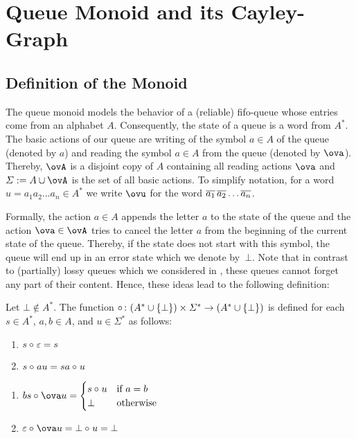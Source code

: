 \section{Queue Monoid and its Cayley-Graph}
\subsection{Definition of the Monoid}
The queue monoid models the behavior of a (reliable) fifo-queue whose entries come from an alphabet $A$. Consequently, the state of a queue is a word from $A^*$. The basic actions of our queue are writing of the symbol $a\in A$ of the queue (denoted by $a$) and reading the symbol $a\in A$ from the queue (denoted by $\ova$). Thereby, $\ovA$ is a disjoint copy of $A$ containing all reading actions $\ova$ and $\varSigma:=A\cup\ovA$ is the set of all basic actions. To simplify notation, for a word $u=a_1a_2\dots a_n\in A^*$ we write $\ovu$ for the word $\overline{a_1}\,\overline{a_2}\dots \overline{a_n}$.

Formally, the action $a\in A$ appends the letter $a$ to the state of the queue and the action $\ova\in\ovA$ tries to cancel the letter $a$ from the beginning of the current state of the queue. Thereby, if the state does not start with this symbol, the queue will end up in an error state which we denote by~$\bot$. Note that in contrast to (partially) lossy queues which we considered in \cite{KKP18,Koe18}, these queues cannot forget any part of their content. Hence, these ideas lead to the following definition:

\begin{definition}
	Let $\bot\notin A^*$. The function $\circ_{}\colon(A^*\cup\{\bot\})\times\varSigma^*\to(A^*\cup\{\bot\})$ is defined for each $s\in A^*$, $a,b\in A$, and $u\in\varSigma^*$ as follows:
	
	\begin{minipage}{0.45\linewidth}
	\begin{enumerate}[(1)]
		\item $s\circ_{} \varepsilon=s$
		\item $s\circ_{} au=sa\circ_{} u$
		
	\end{enumerate}
    \end{minipage}
    \begin{minipage}{0.45\linewidth}
    	\begin{enumerate}[(1)]
    		\addtocounter{enumi}{2}
    		\item $bs\opx \ova u=\begin{cases}
    		s\opx u & \text{if }a=b\\
    		\bot & \text{otherwise}
    		\end{cases}$
    		\item $\varepsilon\opx \ova u=\bot\opx u=\bot$
    	\end{enumerate}
    \end{minipage}

    
\end{definition}

